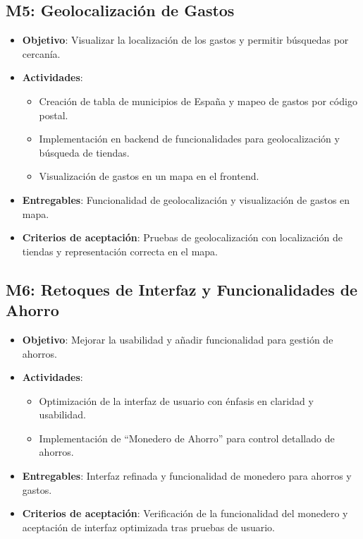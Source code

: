 \subsection{M5: Geolocalización de Gastos}
\begin{itemize}
    \item \textbf{Objetivo}: Visualizar la localización de los gastos y permitir búsquedas por cercanía.
    \item \textbf{Actividades}:
        \begin{itemize}
            \item Creación de tabla de municipios de España y mapeo de gastos por código postal.
            \item Implementación en backend de funcionalidades para geolocalización y búsqueda de tiendas.
            \item Visualización de gastos en un mapa en el frontend.
        \end{itemize}
    \item \textbf{Entregables}: Funcionalidad de geolocalización y visualización de gastos en mapa.
    \item \textbf{Criterios de aceptación}: Pruebas de geolocalización con localización de tiendas y representación correcta en el mapa.
\end{itemize}

\subsection{M6: Retoques de Interfaz y Funcionalidades de Ahorro}
\begin{itemize}
    \item \textbf{Objetivo}: Mejorar la usabilidad y añadir funcionalidad para gestión de ahorros.
    \item \textbf{Actividades}:
        \begin{itemize}
            \item Optimización de la interfaz de usuario con énfasis en claridad y usabilidad.
            \item Implementación de ``Monedero de Ahorro'' para control detallado de ahorros.
        \end{itemize}
    \item \textbf{Entregables}: Interfaz refinada y funcionalidad de monedero para ahorros y gastos.
    \item \textbf{Criterios de aceptación}: Verificación de la funcionalidad del monedero y aceptación de interfaz optimizada tras pruebas de usuario.
\end{itemize}

